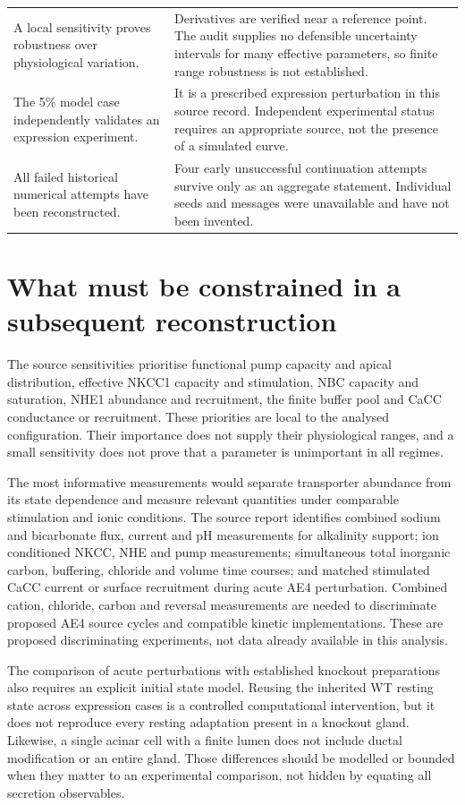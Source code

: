 \begin{longtable}{>{\raggedright\arraybackslash}p{.30\linewidth}>{\raggedright\arraybackslash}p{.63\linewidth}}
A local sensitivity proves robustness over physiological variation. & Derivatives are verified near a reference point. The audit supplies no defensible uncertainty intervals for many effective parameters, so finite range robustness is not established.\\
The 5\% model case independently validates an expression experiment. & It is a prescribed expression perturbation in this source record. Independent experimental status requires an appropriate source, not the presence of a simulated curve.\\
All failed historical numerical attempts have been reconstructed. & Four early unsuccessful continuation attempts survive only as an aggregate statement. Individual seeds and messages were unavailable and have not been invented.\\\bottomrule
\end{longtable}

\section{What must be constrained in a subsequent reconstruction}
\label{sec:report-future}
The source sensitivities prioritise functional pump capacity and apical distribution, effective NKCC1 capacity and stimulation, NBC capacity and saturation, NHE1 abundance and recruitment, the finite buffer pool and CaCC conductance or recruitment. These priorities are local to the analysed configuration. Their importance does not supply their physiological ranges, and a small sensitivity does not prove that a parameter is unimportant in all regimes.

The most informative measurements would separate transporter abundance from its state dependence and measure relevant quantities under comparable stimulation and ionic conditions. The source report identifies combined sodium and bicarbonate flux, current and pH measurements for alkalinity support; ion conditioned NKCC, NHE and pump measurements; simultaneous total inorganic carbon, buffering, chloride and volume time courses; and matched stimulated CaCC current or surface recruitment during acute AE4 perturbation. Combined cation, chloride, carbon and reversal measurements are needed to discriminate proposed AE4 source cycles and compatible kinetic implementations. These are proposed discriminating experiments, not data already available in this analysis.

The comparison of acute perturbations with established knockout preparations also requires an explicit initial state model. Reusing the inherited WT resting state across expression cases is a controlled computational intervention, but it does not reproduce every resting adaptation present in a knockout gland. Likewise, a single acinar cell with a finite lumen does not include ductal modification or an entire gland. Those differences should be modelled or bounded when they matter to an experimental comparison, not hidden by equating all secretion observables.

